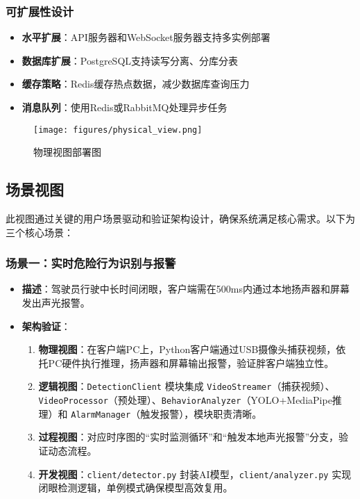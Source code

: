 \documentclass[a4paper,12pt]{article}
\begin{document}
\subsubsection{可扩展性设计}
\begin{itemize}
  \item \textbf{水平扩展}：API服务器和WebSocket服务器支持多实例部署
  \item \textbf{数据库扩展}：PostgreSQL支持读写分离、分库分表
  \item \textbf{缓存策略}：Redis缓存热点数据，减少数据库查询压力
  \item \textbf{消息队列}：使用Redis或RabbitMQ处理异步任务
\end{itemize}

\begin{figure}[h]
  \centering
  \texttt{[image: figures/physical\_view.png]}
  \caption{物理视图部署图}
  \label{fig:physical_view}
\end{figure}

\subsection{场景视图}
此视图通过关键的用户场景驱动和验证架构设计，确保系统满足核心需求。以下为三个核心场景：

\subsubsection{场景一：实时危险行为识别与报警}
\begin{itemize}
  \item \textbf{描述}：驾驶员行驶中长时间闭眼，客户端需在500ms内通过本地扬声器和屏幕发出声光报警。
  \item \textbf{架构验证}：
    \begin{enumerate}
      \item \textbf{物理视图}：在客户端PC上，Python客户端通过USB摄像头捕获视频，依托PC硬件执行推理，扬声器和屏幕输出报警，验证胖客户端独立性。
      \item \textbf{逻辑视图}：\texttt{DetectionClient} 模块集成 \texttt{VideoStreamer}（捕获视频）、\texttt{VideoProcessor}（预处理）、\texttt{BehaviorAnalyzer}（YOLO+MediaPipe推理）和 \texttt{AlarmManager}（触发报警），模块职责清晰。
      \item \textbf{过程视图}：对应时序图的“实时监测循环”和“触发本地声光报警”分支，验证动态流程。
      \item \textbf{开发视图}：\texttt{client/detector.py} 封装AI模型，\texttt{client/analyzer.py} 实现闭眼检测逻辑，单例模式确保模型高效复用。
    \end{enumerate}
\end{itemize}
\end{document}
